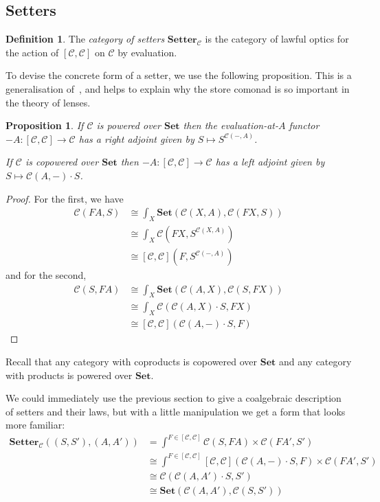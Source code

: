 \documentclass[11pt,letterpaper]{article}
\theoremstyle{plain}
\newtheorem{proposition}[theorem]{Proposition}
\theoremstyle{definition}
\newtheorem{definition}[theorem]{Definition}
\newcommand{\C}{\mathscr{C}}
\newcommand{\Set}{\mathbf{Set}}
\newcommand{\Setter}{\mathbf{Setter}}
\begin{document}
\subsection{Setters}\label{sec:setters}

\begin{definition}
  The \emph{category of setters} $\Setter_\C$ is the category of lawful optics for the action of $[\C, \C]$ on $\C$ by evaluation.
\end{definition}

To devise the concrete form of a setter, we use the following proposition. This is a generalisation of~\cite[Proposition 2.2]{SecondOrderFunctionals}, and helps to explain why the store comonad is so important in the theory of lenses.

\begin{proposition}
If $\C$ is powered over $\Set$ then the evaluation-at-$A$ functor $-A : [\C, \C] \to \C$ has a right adjoint given by $S \mapsto S^{\C(-, A)}$.

If $\C$ is copowered over $\Set$ then $-A : [\C, \C] \to \C$ has a left adjoint given by $S \mapsto \C(A, -) \cdot S$.
\end{proposition}
\begin{proof}
For the first, we have
\begin{align*}
\C(FA, S)
&\cong \int_X \Set(\C(X, A), \C(FX, S)) \\
&\cong \int_X \C(FX, S^{\C(X, A)}) \\
&\cong [\C, \C](F, S^{\C(-, A)})
\end{align*}
and for the second,
\begin{align*}
\C(S, FA)
&\cong \int_X \Set(\C(A, X), \C(S, FX)) \\
&\cong \int_X \C(\C(A, X) \cdot S, FX) \\
&\cong [\C, \C](\C(A, -) \cdot S, F)
\end{align*}
\end{proof}

Recall that any category with coproducts is copowered over $\Set$ and any category with products is powered over $\Set$.

We could immediately use the previous section to give a coalgebraic description of setters and their laws, but with a little manipulation we get a form that looks more familiar:
\begin{align*}
  \Setter_\C((S, S'), (A, A')) &= \int^{F \in [\C, \C]} \C(S, FA) \times \C(FA', S') \\
                               &\cong \int^{F \in [\C, \C]} [\C, \C](\C(A, -) \cdot S, F) \times \C(FA', S') \\
                               &\cong \C(\C(A, A') \cdot S, S') \\
                               &\cong \Set(\C(A, A'), \C(S, S'))
\end{align*}
\end{document}

